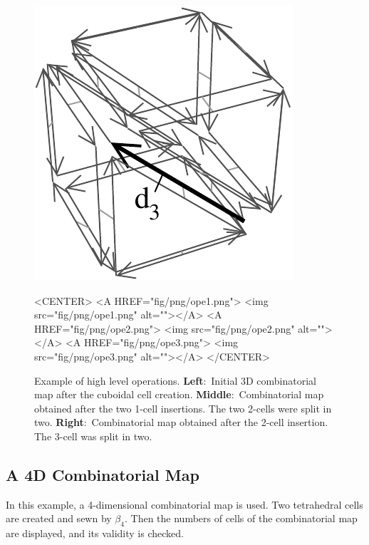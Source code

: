 \begin{figure}
\begin{ccTexOnly}
\begin{center}
      \includegraphics[width=\largFig]{Combinatorial_map/fig/pdf/ope3}
    \end{center}
  \end{ccTexOnly}
  \begin{ccHtmlOnly}
    <CENTER>
    <A HREF="fig/png/ope1.png"> <img src="fig/png/ope1.png" alt=""></A>
    <A HREF="fig/png/ope2.png"> <img src="fig/png/ope2.png" alt=""></A>
    <A HREF="fig/png/ope3.png"> <img src="fig/png/ope3.png" alt=""></A>
    </CENTER>
    \end{ccHtmlOnly}  
      \caption{Example of high level operations.  
        \textbf{Left}:~Initial 3D combinatorial map after the cuboidal 
        cell creation. \textbf{Middle}:~Combinatorial map obtained after
        the two 1-cell insertions. The two 2-cells were split in two.
        \textbf{Right}:~Combinatorial map obtained after the 2-cell 
        insertion. The 3-cell was split in two.}
    \label{fig_exemple_ope}
\end{figure}


\subsection{A 4D Combinatorial Map}
In this example, a 4-dimensional combinatorial map is used.  Two
tetrahedral cells are created and sewn by $\beta_4$.  Then the numbers
of cells of the combinatorial map are displayed, and its validity is
checked. 

